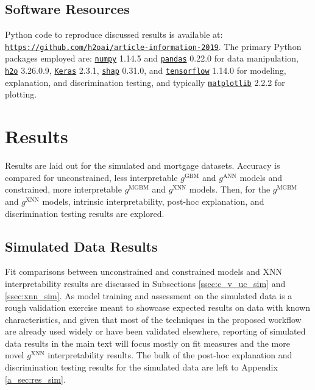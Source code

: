 \documentclass[information,article,submit,moreauthors,pdftex]{definitions/mdpi}
\begin{document}
\subsection{Software Resources}\label{ssec:soft}

Python code to reproduce discussed results is available at: \texttt{\url{https://github.com/h2oai/article-information-2019}}. The primary Python packages employed are: \href{https://numpy.org/}{\texttt{numpy}} 1.14.5 and \href{https://pandas.pydata.org/}{\texttt{pandas}} 0.22.0 for data manipulation, \href{https://github.com/h2oai/h2o-3}{\texttt{h2o}} 3.26.0.9, \href{https://keras.io/}{\texttt{Keras}} 2.3.1, \href{https://github.com/slundberg/shap}{\texttt{shap}} 0.31.0, and \href{https://www.tensorflow.org/}{\texttt{tensorflow}} 1.14.0 for modeling, explanation, and discrimination testing, and typically \href{https://matplotlib.org/}{\texttt{matplotlib}} 2.2.2 for plotting. 

\section{Results}\label{sec:res}

Results are laid out for the simulated and mortgage datasets. Accuracy is compared for unconstrained, less interpretable $g^{\text{GBM}}$ and $g^{\text{ANN}}$ models and constrained, more interpretable $g^{\text{MGBM}}$ and $g^{\text{XNN}}$ models. Then, for the  $g^{\text{MGBM}}$ and $g^{\text{XNN}}$ models, intrinsic interpretability, post-hoc explanation, and discrimination testing results are explored.

\subsection{Simulated Data Results}

Fit comparisons between unconstrained and constrained models and XNN interpretability results are discussed in Subsections \ref{ssec:c_v_uc_sim} and \ref{ssec:xnn_sim}. As model training and assessment on the simulated data is a rough validation exercise meant to showcase expected results on data with known characteristics, and given that most of the techniques in the proposed workflow are already used widely or have been validated elsewhere, reporting of simulated data results in the main text will focus mostly on fit measures and the more novel $g^\text{XNN}$ interpretability results. The bulk of the post-hoc explanation and discrimination testing results for the simulated data are left to Appendix \ref{a_sec:res_sim}. 
\end{document}
